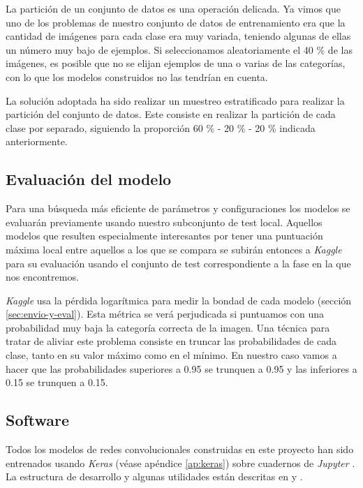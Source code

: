 La partición de un conjunto de datos es una operación delicada. Ya vimos que
uno de los problemas de nuestro conjunto de datos de entrenamiento era que la
cantidad de imágenes para cada clase era muy variada, teniendo algunas de ellas
un número muy bajo de ejemplos. Si seleccionamos aleatoriamente el 40 \% de las
imágenes, es posible que no se elijan ejemplos de una o varias de las
categorías, con lo que los modelos construidos no las tendrían en cuenta.

La solución adoptada ha sido realizar un muestreo estratificado para realizar la partición del conjunto de datos. Este consiste en realizar la partición de cada clase por separado, siguiendo la proporción 60 \% - 20 \% - 20 \% indicada anteriormente.

\subsection{Evaluación del modelo}

Para una búsqueda más eficiente de parámetros y configuraciones los modelos se evaluarán previamente usando nuestro subconjunto de test local. Aquellos modelos que resulten especialmente interesantes por tener una puntuación máxima local entre aquellos a los que se compara se subirán entonces a \textit{Kaggle} para su evaluación usando el conjunto de test correspondiente a la fase en la que nos encontremos.

\textit{Kaggle} usa la pérdida logarítmica para medir la bondad de cada modelo (sección 
\ref{sec:envio-y-eval}). Esta métrica se verá perjudicada si puntuamos con una probabilidad muy baja la categoría correcta de la imagen. Una técnica para tratar de aliviar este problema consiste en truncar las probabilidades de cada clase, tanto en su valor máximo como en el mínimo. En nuestro caso vamos a hacer que las probabilidades superiores a 0.95 se trunquen a 0.95 y las inferiores a 0.15 se trunquen a 0.15.


\subsection{Software}

Todos los modelos de redes convolucionales construidas en este proyecto han sido entrenados usando \textit{Keras} (véase apéndice \ref{ap:keras}) sobre cuadernos de \textit{Jupyter} \parencite{jupyter}. La estructura de desarrollo y algunas utilidades están descritas en \parencite{fastai} y \parencite{felixyu}.


